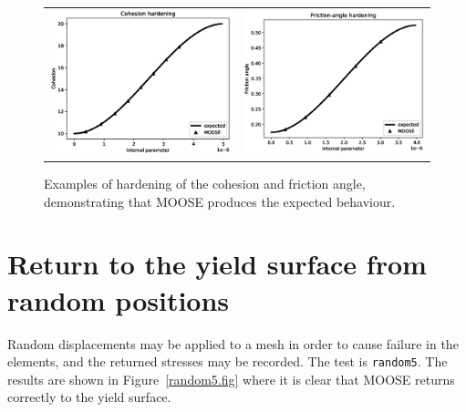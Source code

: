 \documentclass[]{scrreprt}
\begin{document}
\begin{figure}[htb]
  \begin{center}
    \begin{tabular}{ll}
\includegraphics[width=6cm]{small_deform_hard_21.eps} &
\includegraphics[width=6cm]{small_deform_hard_22.eps}
\end{tabular}
\caption{Examples of hardening of the cohesion and friction angle,
  demonstrating that MOOSE produces the expected behaviour.}
\label{small_deform_hard_21.fig}
\end{center}
\end{figure}

\section{Return to the yield surface from random positions}

Random displacements may be applied to a mesh in order to cause
failure in the elements, and the returned stresses may be recorded.
The test is {\tt random5}.  The results are shown in
Figure~\ref{random5.fig} where it is clear that MOOSE returns
correctly to the yield surface.
\end{document}
